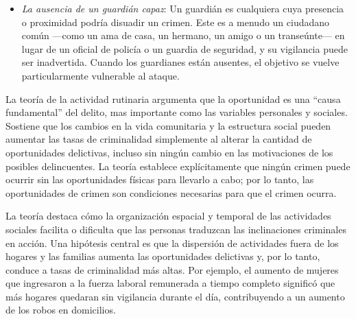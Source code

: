 \documentclass[
  spanish,
  letterpaper,
  DIV=11,
  numbers=noendperiod]{scrreprt}
\begin{document}
\begin{tcolorbox}
\begin{itemize}
  \begin{itemize}
  \item
    Valor: Cuán deseable es el objetivo para el delincuente (por
    ejemplo, CDs populares sobre los clásicos).
  \item
    Inercia: La facilidad con la que el objetivo puede ser movido o
    transportado (por ejemplo, los productos electrónicos ligeros son
    más susceptibles que los electrodomésticos pesados).
  \item
    Visibilidad: Cuán expuesto está el objetivo a posibles delincuentes
    (por ejemplo, mostrar dinero en público o dejar objetos de valor
    cerca de una ventana).
  \item
    Acceso: Cuán fácilmente puede un delincuente llegar al objetivo (por
    ejemplo, patrones de calles, bienes colocados cerca de una puerta).
  \end{itemize}
\item
  \emph{La ausencia de un guardián capaz}: Un guardián es cualquiera
  cuya presencia o proximidad podría disuadir un crimen. Este es a
  menudo un ciudadano común ---como un ama de casa, un hermano, un amigo
  o un transeúnte--- en lugar de un oficial de policía o un guardia de
  seguridad, y su vigilancia puede ser inadvertida. Cuando los
  guardianes están ausentes, el objetivo se vuelve particularmente
  vulnerable al ataque.
\end{itemize}

La teoría de la actividad rutinaria argumenta que la oportunidad es una
``causa fundamental'' del delito, mas importante como las variables
personales y sociales. Sostiene que los cambios en la vida comunitaria y
la estructura social pueden aumentar las tasas de criminalidad
simplemente al alterar la cantidad de oportunidades delictivas, incluso
sin ningún cambio en las motivaciones de los posibles delincuentes. La
teoría establece explícitamente que ningún crimen puede ocurrir sin las
oportunidades físicas para llevarlo a cabo; por lo tanto, las
oportunidades de crimen son condiciones necesarias para que el crimen
ocurra.

La teoría destaca cómo la organización espacial y temporal de las
actividades sociales facilita o dificulta que las personas traduzcan las
inclinaciones criminales en acción. Una hipótesis central es que la
dispersión de actividades fuera de los hogares y las familias aumenta
las oportunidades delictivas y, por lo tanto, conduce a tasas de
criminalidad más altas. Por ejemplo, el aumento de mujeres que
ingresaron a la fuerza laboral remunerada a tiempo completo significó
que más hogares quedaran sin vigilancia durante el día, contribuyendo a
un aumento de los robos en domicilios.


\end{tcolorbox}
\end{document}
